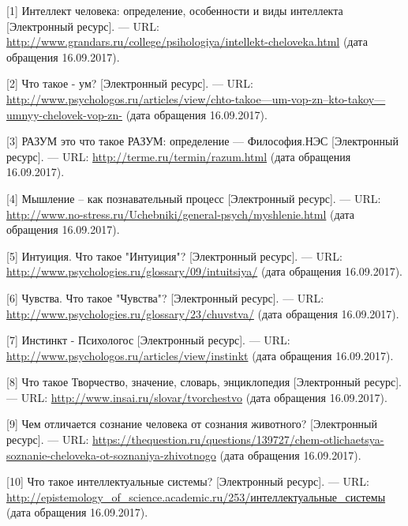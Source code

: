 \documentclass[14pt,a4paper,report]{report}
\begin{document}
\begin{flushleft}

[1] Интеллект человека: определение, особенности и виды интеллекта [Электронный ресурс]. — URL: \href{http://www.grandars.ru/college/psihologiya/intellekt-cheloveka.html}{http://www.grandars.ru/college/psihologiya/intellekt-cheloveka.html} (дата обращения 16.09.2017).

[2] Что такое - ум? [Электронный ресурс]. — URL: \href{http://www.psychologos.ru/articles/view/chto-takoe---um-vop-zn--kto-takoy---umnyy-chelovek-vop-zn-}{http://www.psychologos.ru/articles/view/chto-takoe---um-vop-zn--kto-takoy---umnyy-chelovek-vop-zn-} (дата обращения 16.09.2017).

[3] РАЗУМ это что такое РАЗУМ: определение — Философия.НЭС [Электронный ресурс]. — URL: \href{http://terme.ru/termin/razum.html}{http://terme.ru/termin/razum.html} (дата обращения 16.09.2017).

[4] Мышление – как познавательный процесс [Электронный ресурс]. — URL: \href{http://www.no-stress.ru/Uchebniki/general-psych/myshlenie.html}{http://www.no-stress.ru/Uchebniki/general-psych/myshlenie.html} (дата обращения 16.09.2017).

[5] Интуиция. Что такое "Интуиция"? [Электронный ресурс]. — URL: \href{http://www.psychologies.ru/glossary/09/intuitsiya/}{http://www.psychologies.ru/glossary/09/intuitsiya/} (дата обращения 16.09.2017).

[6] Чувства. Что такое "Чувства"? [Электронный ресурс]. — URL: \href{http://www.psychologies.ru/glossary/23/chuvstva/}{http://www.psychologies.ru/glossary/23/chuvstva/} (дата обращения 16.09.2017).

[7] Инстинкт - Психологос [Электронный ресурс]. — URL: \href{http://www.psychologos.ru/articles/view/instinkt}{http://www.psychologos.ru/articles/view/instinkt} (дата обращения 16.09.2017).

[8] Что такое Творчество, значение, словарь, энциклопедия [Электронный ресурс]. — URL: \href{http://www.insai.ru/slovar/tvorchestvo}{http://www.insai.ru/slovar/tvorchestvo} (дата обращения 16.09.2017).

[9] Чем отличается сознание человека от сознания животного? [Электронный ресурс]. — URL: \href{https://thequestion.ru/questions/139727/chem-otlichaetsya-soznanie-cheloveka-ot-soznaniya-zhivotnogo}{https://thequestion.ru/questions/139727/chem-otlichaetsya-soznanie-cheloveka-ot-soznaniya-zhivotnogo} (дата обращения 16.09.2017).

[10] Что такое интеллектуальные системы? [Электронный ресурс]. — URL: \href{http://epistemology\_of\_science.academic.ru/253/\%D0\%B8\%D0\%BD\%D1\%82\%D0\%B5\%D0\%BB\%D0\%BB\%D0\%B5\%D0\%BA\%D1\%82\%D1\%83\%D0\%B0\%D0\%BB\%D1\%8C\%D0\%BD\%D1\%8B\%D0\%B5\_\%D1\%81\%D0\%B8\%D1\%81\%D1\%82\%D0\%B5\%D0\%BC\%D1\%8B}{http://epistemology\_of\_science.academic.ru/253/интеллектуальные\_системы} (дата обращения 16.09.2017).


\end{flushleft}
\end{document}
